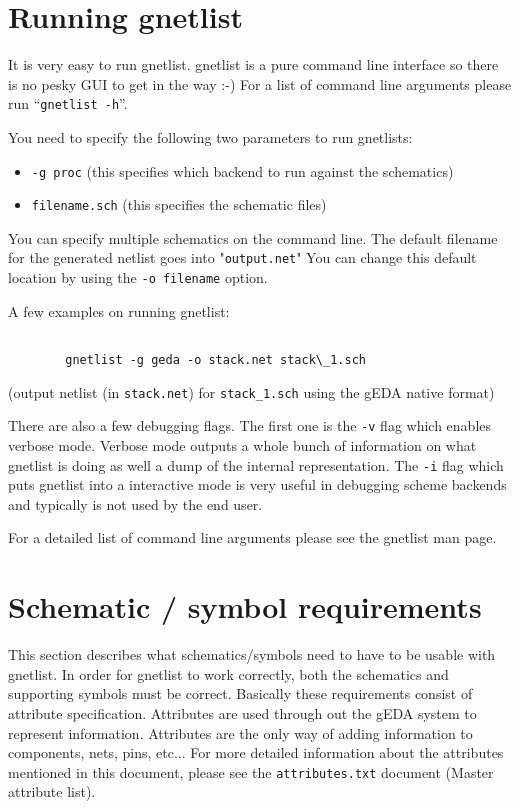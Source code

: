 \documentclass{article}
\begin{document}
\section{Running gnetlist}
It is very easy to run gnetlist.  gnetlist is a pure command line
interface so there is no pesky GUI to get in the way :-) For a list of
command line arguments please run ``{\tt gnetlist -h}''.

You need to specify the following two parameters to run gnetlists:
\begin{itemize}
\item {\tt -g proc}  (this specifies which backend to run against the schematics) 
\item {\tt filename.sch}    (this specifies the schematic files)
\end{itemize}
You can specify multiple schematics on the command line.  The default
filename for the generated netlist goes into "{\tt output.net}" You can
change this default location by using the {\tt -o filename} option.

A few examples on running gnetlist:
\begin{verbatim}

        gnetlist -g geda -o stack.net stack\_1.sch

\end{verbatim}
(output netlist (in {\tt stack.net}) for {\tt stack\_1.sch} using the gEDA native
format)

There are also a few debugging flags.  The first one is the {\tt -v}
flag which enables verbose mode.  Verbose mode outputs a whole bunch
of information on what gnetlist is doing as well a dump of the
internal representation.  The {\tt -i} flag which puts gnetlist into a
interactive mode is very useful in debugging scheme backends and
typically is not used by the end user.

For a detailed list of command line arguments please see the gnetlist
man page.

\section{Schematic / symbol requirements}
This section describes what schematics/symbols need to have to be
usable with gnetlist.  In order for gnetlist to work correctly, both
the schematics and supporting symbols must be correct.  Basically
these requirements consist of attribute specification.  Attributes are
used through out the gEDA system to represent information.  Attributes
are the only way of adding information to components, nets, pins,
etc...  For more detailed information about the attributes mentioned
in this document, please see the {\tt attributes.txt} document (Master
attribute list).
\end{document}
